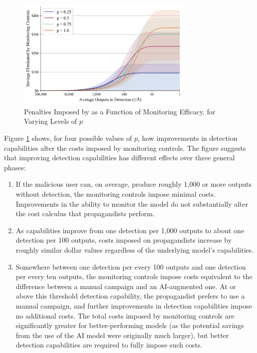 \documentclass{article}
\begin{document}
\begin{figure}[h]
  \centering
  \includegraphics[width=0.75\textwidth]{figures/detection_penalties.jpg}
  \caption{Penalties Imposed by as a Function of Monitoring Efficacy, for Varying Levels of $p$}
  \label{fig:penalties}
\end{figure}

Figure \ref{fig:penalties} shows, for four possible values of $p$, how improvements in detection capabilities alter the costs imposed by monitoring controls. The figure suggests that improving detection capabilities has different effects over three general phases:

\begin{enumerate}
  \item If the malicious user can, on average, produce roughly 1,000 or more outputs without detection, the monitoring controls impose minimal costs. Improvements in the ability to monitor the model do not substantially alter the cost calculus that propagandists perform.
  \item As capabilities improve from one detection per 1,000 outputs to about one detection per 100 outputs, costs imposed on propagandists increase by roughly similar dollar values regardless of the underlying model's capabilities. 
  \item Somewhere between one detection per every 100 outputs and one detection per every ten outputs, the monitoring controls impose costs equivalent to the difference between a manual campaign and an AI-augmented one. At or above this threshold detection capability, the propagandist prefers to use a manual campaign, and further improvements in detection capabilities impose no additional costs. The total costs imposed by monitoring controls are significantly greater for better-performing models (as the potential savings from the use of the AI model were originally much larger), but better detection capabilities are required to fully impose such costs.  
\end{enumerate}
\end{document}
